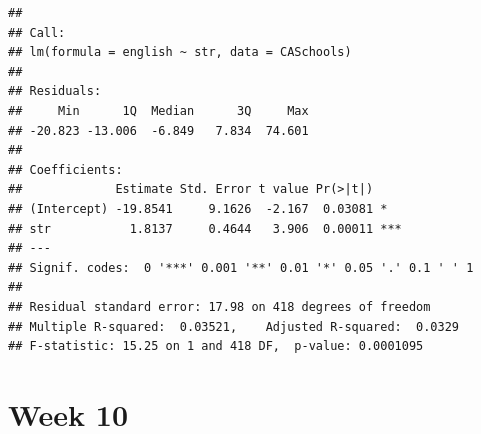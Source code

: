 \documentclass[
]{book}
\newenvironment{Shaded}{\begin{snugshade}}{\end{snugshade}}
\newcommand{\DataTypeTok}[1]{\textcolor[rgb]{0.13,0.29,0.53}{#1}}
\newcommand{\DecValTok}[1]{\textcolor[rgb]{0.00,0.00,0.81}{#1}}
\newcommand{\KeywordTok}[1]{\textcolor[rgb]{0.13,0.29,0.53}{\textbf{#1}}}
\newcommand{\NormalTok}[1]{#1}
\newcommand{\OperatorTok}[1]{\textcolor[rgb]{0.81,0.36,0.00}{\textbf{#1}}}
\newcommand{\OtherTok}[1]{\textcolor[rgb]{0.56,0.35,0.01}{#1}}
\newcommand{\StringTok}[1]{\textcolor[rgb]{0.31,0.60,0.02}{#1}}
\begin{document}
\begin{verbatim}
## 
## Call:
## lm(formula = english ~ str, data = CASchools)
## 
## Residuals:
##     Min      1Q  Median      3Q     Max 
## -20.823 -13.006  -6.849   7.834  74.601 
## 
## Coefficients:
##             Estimate Std. Error t value Pr(>|t|)    
## (Intercept) -19.8541     9.1626  -2.167  0.03081 *  
## str           1.8137     0.4644   3.906  0.00011 ***
## ---
## Signif. codes:  0 '***' 0.001 '**' 0.01 '*' 0.05 '.' 0.1 ' ' 1
## 
## Residual standard error: 17.98 on 418 degrees of freedom
## Multiple R-squared:  0.03521,    Adjusted R-squared:  0.0329 
## F-statistic: 15.25 on 1 and 418 DF,  p-value: 0.0001095
\end{verbatim}

\hypertarget{week-10}{%
\section{Week 10}\label{week-10}}

\begin{Shaded}
\end{Shaded}
\end{document}
